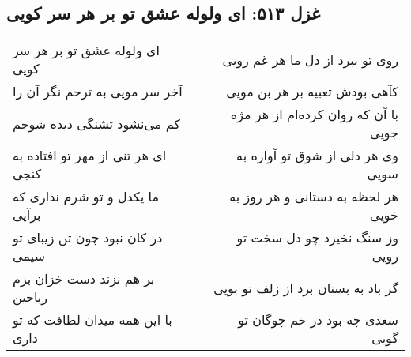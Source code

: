 \begin{center}
\section*{غزل ۵۱۳: ای ولوله عشق تو بر هر سر کویی}
\label{sec:513}
\begin{longtable}{l p{0.5cm} r}
ای ولوله عشق تو بر هر سر کویی
&&
روی تو ببرد از دل ما هر غم رویی
\\
آخر سر مویی به ترحم نگر آن را
&&
کآهی بودش تعبیه بر هر بن مویی
\\
کم می‌نشود تشنگی دیده شوخم
&&
با آن که روان کرده‌ام از هر مژه جویی
\\
ای هر تنی از مهر تو افتاده به کنجی
&&
وی هر دلی از شوق تو آواره به سویی
\\
ما یکدل و تو شرم نداری که برآیی
&&
هر لحظه به دستانی و هر روز به خویی
\\
در کان نبود چون تن زیبای تو سیمی
&&
وز سنگ نخیزد چو دل سخت تو رویی
\\
بر هم نزند دست خزان بزم ریاحین
&&
گر باد به بستان برد از زلف تو بویی
\\
با این همه میدان لطافت که تو داری
&&
سعدی چه بود در خم چوگان تو گویی
\\
\end{longtable}
\end{center}

